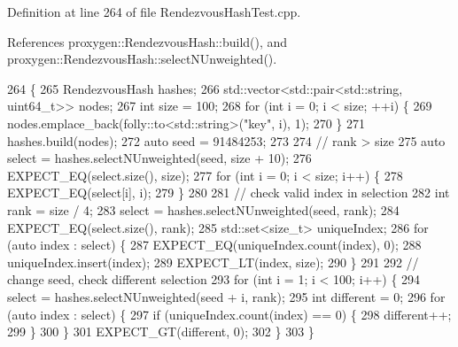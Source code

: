 Definition at line 264 of file Rendezvous\+Hash\+Test.\+cpp.



References proxygen\+::\+Rendezvous\+Hash\+::build(), and proxygen\+::\+Rendezvous\+Hash\+::select\+N\+Unweighted().


\begin{DoxyCode}
264                                         \{
265   RendezvousHash hashes;
266   std::vector<std::pair<std::string, uint64\_t>> nodes;
267   \textcolor{keywordtype}{int} size = 100;
268   \textcolor{keywordflow}{for} (\textcolor{keywordtype}{int} i = 0; i < size; ++i) \{
269     nodes.emplace\_back(folly::to<std::string>(\textcolor{stringliteral}{"key"}, i), 1);
270   \}
271   hashes.build(nodes);
272   \textcolor{keyword}{auto} seed = 91484253;
273 
274   \textcolor{comment}{// rank > size}
275   \textcolor{keyword}{auto} select = hashes.selectNUnweighted(seed, size + 10);
276   EXPECT\_EQ(select.size(), size);
277   \textcolor{keywordflow}{for} (\textcolor{keywordtype}{int} i = 0; i < size; i++) \{
278     EXPECT\_EQ(select[i], i);
279   \}
280 
281   \textcolor{comment}{// check valid index in selection}
282   \textcolor{keywordtype}{int} rank = size / 4;
283   select = hashes.selectNUnweighted(seed, rank);
284   EXPECT\_EQ(select.size(), rank);
285   std::set<size\_t> uniqueIndex;
286   \textcolor{keywordflow}{for} (\textcolor{keyword}{auto} index : select) \{
287     EXPECT\_EQ(uniqueIndex.count(index), 0);
288     uniqueIndex.insert(index);
289     EXPECT\_LT(index, size);
290   \}
291 
292   \textcolor{comment}{// change seed, check different selection}
293   \textcolor{keywordflow}{for} (\textcolor{keywordtype}{int} i = 1; i < 100; i++) \{
294     select = hashes.selectNUnweighted(seed + i, rank);
295     \textcolor{keywordtype}{int} different = 0;
296     \textcolor{keywordflow}{for} (\textcolor{keyword}{auto} index : select) \{
297       \textcolor{keywordflow}{if} (uniqueIndex.count(index) == 0) \{
298         different++;
299       \}
300     \}
301     EXPECT\_GT(different, 0);
302   \}
303 \}
\end{DoxyCode}
